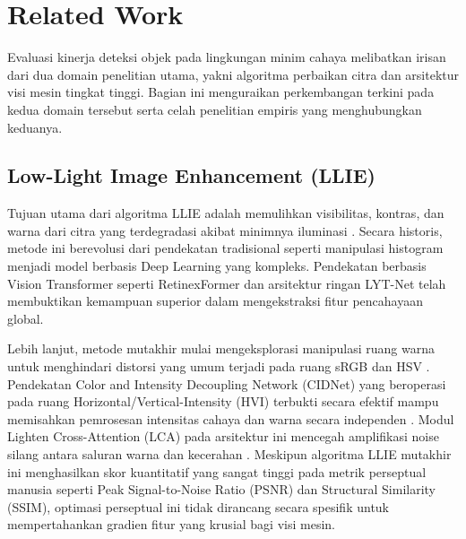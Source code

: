 \documentclass[conference]{IEEEtran}
\begin{document}
\section{Related Work}
Evaluasi kinerja deteksi objek pada lingkungan minim cahaya melibatkan irisan dari dua domain penelitian utama, yakni algoritma perbaikan citra dan arsitektur visi mesin tingkat tinggi. Bagian ini menguraikan perkembangan terkini pada kedua domain tersebut serta celah penelitian empiris yang menghubungkan keduanya.

\subsection{Low-Light Image Enhancement (LLIE)} Tujuan utama dari algoritma LLIE adalah memulihkan visibilitas, kontras, dan warna dari citra yang terdegradasi akibat minimnya iluminasi \cite{liu2021benchmark}. Secara historis, metode ini berevolusi dari pendekatan tradisional seperti manipulasi histogram menjadi model berbasis Deep Learning yang kompleks. Pendekatan berbasis Vision Transformer seperti RetinexFormer \cite{cai2023retinexformer} dan arsitektur ringan LYT-Net \cite{brateanu2025lytnet} telah membuktikan kemampuan superior dalam mengekstraksi fitur pencahayaan global.

Lebih lanjut, metode mutakhir mulai mengeksplorasi manipulasi ruang warna untuk menghindari distorsi yang umum terjadi pada ruang sRGB dan HSV \cite{yan2025hvi}. Pendekatan Color and Intensity Decoupling Network (CIDNet) yang beroperasi pada ruang Horizontal/Vertical-Intensity (HVI) terbukti secara efektif mampu memisahkan pemrosesan intensitas cahaya dan warna secara independen \cite{yan2025hvi}. Modul Lighten Cross-Attention (LCA) pada arsitektur ini mencegah amplifikasi noise silang antara saluran warna dan kecerahan \cite{darmawan2025vitra}. Meskipun algoritma LLIE mutakhir ini menghasilkan skor kuantitatif yang sangat tinggi pada metrik perseptual manusia seperti Peak Signal-to-Noise Ratio (PSNR) dan Structural Similarity (SSIM), optimasi perseptual ini tidak dirancang secara spesifik untuk mempertahankan gradien fitur yang krusial bagi visi mesin.
\end{document}
